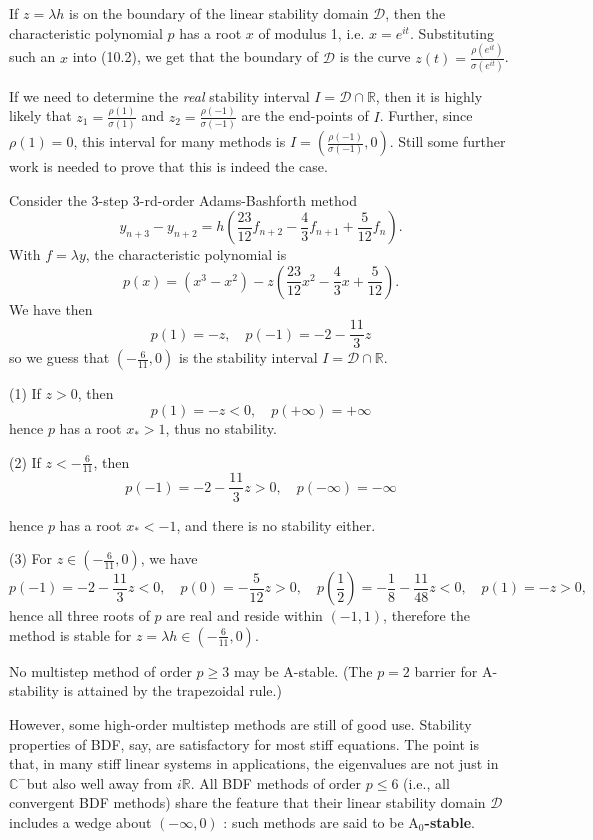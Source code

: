 \documentclass[a4paper]{article}
\begin{document}
If $z=\lambda h$ is on the boundary of the linear stability domain $\mathcal{D}$, then the characteristic polynomial $p$ has a root $x$ of modulus 1, i.e. $x=e^{i t}$. Substituting such an $x$ into (10.2), we get that the boundary of $\mathcal{D}$ is the curve $z(t)=\frac{\rho\left(e^{i t}\right)}{\sigma\left(e^{i t}\right)}$.

If we need to determine the \textit{real} stability interval $I=\mathcal{D} \cap \mathbb{R}$, then it is highly likely that $z_1=\frac{\rho(1)}{\sigma(1)}$ and $z_2=\frac{\rho(-1)}{\sigma(-1)}$ are the end-points of $I$. Further, since $\rho(1)=0$, this interval for many methods is $I=\left(\frac{\rho(-1)}{\sigma(-1)}, 0\right)$. Still some further work is needed to prove that this is indeed the case.

\begin{example}
    Consider the 3-step 3-rd-order Adams-Bashforth method
\[
y_{n+3}-y_{n+2}=h\left(\frac{23}{12} f_{n+2}-\frac{4}{3} f_{n+1}+\frac{5}{12} f_n\right) .
\]
With $f=\lambda y$, the characteristic polynomial is
\[
p(x)=\left(x^3-x^2\right)-z\left(\frac{23}{12} x^2-\frac{4}{3} x+\frac{5}{12}\right) .
\]
We have then
\[
p(1)=-z, \quad p(-1)=-2-\frac{11}{3} z
\]
so we guess that $\left(-\frac{6}{11}, 0\right)$ is the stability interval $I=\mathcal{D} \cap \mathbb{R}$.

(1) If $z>0$, then
\[
p(1)=-z<0, \quad p(+\infty)=+\infty
\]
hence $p$ has a root $x_*>1$, thus no stability.

(2) If $z<-\frac{6}{11}$, then
\[
p(-1)=-2-\frac{11}{3} z>0, \quad p(-\infty)=-\infty
\]

hence $p$ has a root $x_*<-1$, and there is no stability either.

(3) For $z \in\left(-\frac{6}{11}, 0\right)$, we have
\[
p(-1)=-2-\frac{11}{3} z<0, \quad p(0)=-\frac{5}{12} z>0, \quad p\left(\frac{1}{2}\right)=-\frac{1}{8}-\frac{11}{48} z<0, \quad p(1)=-z>0,
\]
hence all three roots of $p$ are real and reside within $(-1,1)$, therefore the method is stable for $z=\lambda h \in\left(-\frac{6}{11}, 0\right)$.
\end{example}

\begin{theorem}
    No multistep method of order $p \geq 3$ may be A-stable. (The $p=2$ barrier for A-stability is attained by the trapezoidal rule.)
\end{theorem}

However, some high-order multistep methods are still of good use. Stability properties of BDF, say, are satisfactory for most stiff equations. The point is that, in many stiff linear systems in applications, the eigenvalues are not just in $\mathbb{C}^{-}$but also well away from $i \mathbb{R}$. All BDF methods of order $p \leq 6$ (i.e., all convergent BDF methods) share the feature that their linear stability domain $\mathcal{D}$ includes a wedge about $(-\infty, 0)$ : such methods are said to be \textbf{$\text{A}_0$-stable}.
\end{document}
